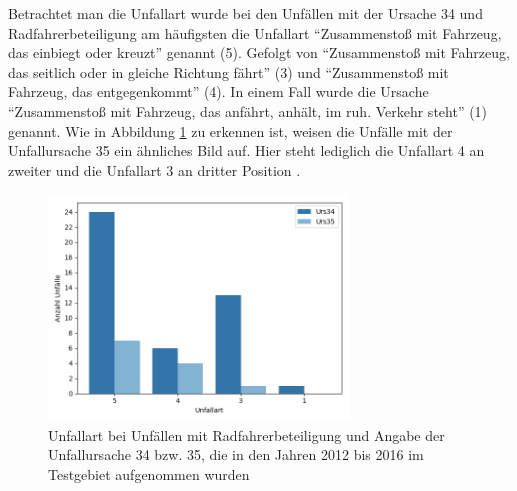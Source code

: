 Betrachtet man die Unfallart wurde bei den Unfällen mit der Ursache 34 und Radfahrerbeteiligung am häufigsten die Unfallart \enquote{Zusammenstoß mit Fahrzeug, das einbiegt oder kreuzt} genannt (5). Gefolgt von \enquote{Zusammenstoß mit Fahrzeug, das seitlich oder in gleiche Richtung fährt} (3) und \enquote{Zusammenstoß mit Fahrzeug, das entgegenkommt} (4). In einem Fall wurde die Ursache \enquote{Zusammenstoß mit Fahrzeug, das anfährt, anhält, im ruh. Verkehr steht} (1) genannt. Wie in Abbildung \ref{fig:Unfallart_Urs34_Urs35_Radbeteiligung} zu erkennen ist, weisen die Unfälle mit der Unfallursache 35 ein ähnliches Bild auf. Hier steht lediglich die Unfallart 4 an zweiter und die Unfallart 3 an dritter Position .

\begin{savenotes}
	\begin{figure}[H]
		\centering
		\includegraphics[width=8cm,height=6cm]{figures/Art_Urs34_Urs35}
		\caption[Unfallart bei Unfällen mit Radfahrerbeteiligung und Angabe der Unfallursache 34 bzw. 35, die in den Jahren 2012 bis 2016 im Testgebiet aufgenommen wurden]{Unfallart bei Unfällen mit Radfahrerbeteiligung und Angabe der Unfallursache 34 bzw. 35, die in den Jahren 2012 bis 2016 im Testgebiet aufgenommen wurden}\label{fig:Unfallart_Urs34_Urs35_Radbeteiligung}
	\end{figure}
\end{savenotes}

